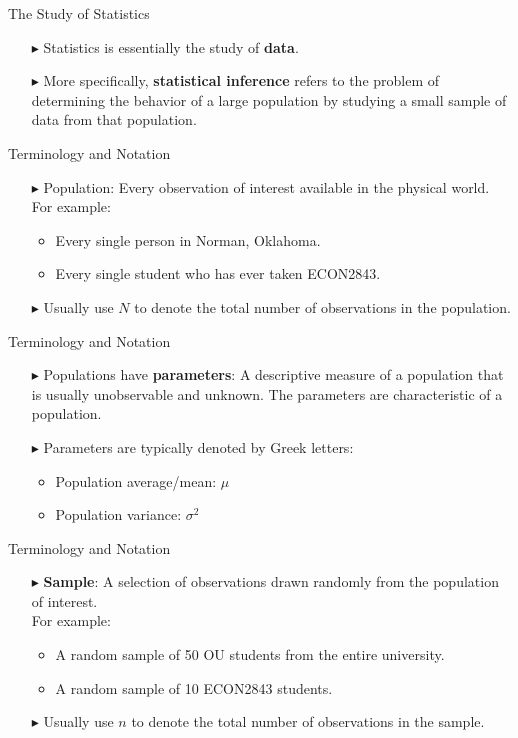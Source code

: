 \documentclass[12pt]{beamer}
\begin{document}
\begin{frame}{The Study of Statistics}
	\begin{itemize}
		\item[$\blacktriangleright$] Statistics is essentially the study of {\bf data}.
		\item[$\blacktriangleright$] More specifically, {\bf statistical inference} refers to the problem of determining the behavior of a large population by studying a small sample of data from that population.
	\end{itemize}
\end{frame}
\begin{frame}{Terminology and Notation}
	\begin{itemize}
		\item[$\blacktriangleright$] Population: Every observation of interest available in the physical world.\medskip\\
		For example:
		\begin{itemize}
			\item Every single person in Norman, Oklahoma.
			\item Every single student who has ever taken ECON2843.
		\end{itemize}
		\item[$\blacktriangleright$] Usually use $N$ to denote the total number of observations in the population.
	\end{itemize}
\end{frame}
\begin{frame}{Terminology and Notation}
	\begin{itemize}
		\item[$\blacktriangleright$] Populations have {\bf parameters}: A descriptive measure of a population that is usually {\color{red}unobservable} and {\color{red}unknown}. The parameters are characteristic of a population.
		\item[$\blacktriangleright$] Parameters are typically denoted by Greek letters:
		\begin{itemize}
			\item Population average/mean: $\mu$
			\item Population variance: $\sigma^2$
		\end{itemize}
	\end{itemize}
\end{frame}
\begin{frame}{Terminology and Notation}
	\begin{itemize}
		\item[$\blacktriangleright$] {\bf Sample}: A selection of observations drawn randomly from the population of interest.\medskip\\
		For example:
		\begin{itemize}
			\item A random sample of 50 OU students from the entire university.
			\item A random sample of 10 ECON2843 students.
		\end{itemize}
		\item[$\blacktriangleright$] Usually use $n$ to denote the total number of observations in the sample.
	\end{itemize}
\end{frame}
\end{document}
